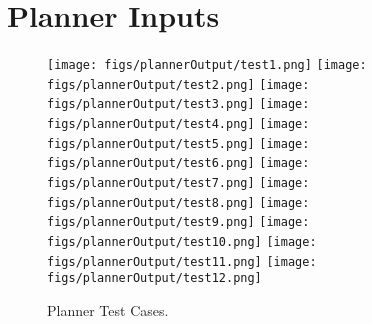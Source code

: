 
\section{Planner Inputs}
\label{app:planner_inputs}


\begin{figure}[ht!]
 \centering
 \texttt{[image: figs/plannerOutput/test1.png]}
 \texttt{[image: figs/plannerOutput/test2.png]}
 \texttt{[image: figs/plannerOutput/test3.png]}
 \texttt{[image: figs/plannerOutput/test4.png]}
 \texttt{[image: figs/plannerOutput/test5.png]}
 \texttt{[image: figs/plannerOutput/test6.png]}
 \texttt{[image: figs/plannerOutput/test7.png]}
 \texttt{[image: figs/plannerOutput/test8.png]}
 \texttt{[image: figs/plannerOutput/test9.png]}
 \texttt{[image: figs/plannerOutput/test10.png]}
 \texttt{[image: figs/plannerOutput/test11.png]}
 \texttt{[image: figs/plannerOutput/test12.png]}
 \caption{Planner Test Cases.}
 \label{fig:planner_tests}
\end{figure}

